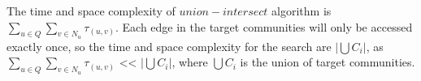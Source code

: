 
The time and space complexity of $union-intersect$ algorithm is $\sum_{u \in Q}{\sum_{v \in N_u}{\tau_{(u,v)}}}$. Each edge in the target communities will only be accessed exactly once, so the time and space complexity for the search are $|\bigcup{C_i}|$, as $\sum_{u \in Q}{\sum_{v \in N_u}{\tau_{(u,v)}}}$ << $|\bigcup{C_i}|$, where $\bigcup{C_i}$ is the union of target communities.



